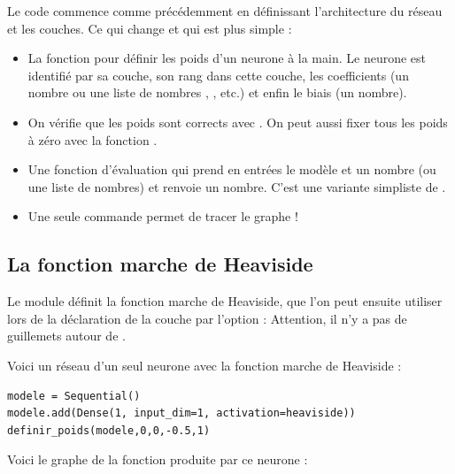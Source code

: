 \documentclass[11pt,class=report,crop=false]{standalone}
\begin{document}
Le code commence comme précédemment en définissant l'architecture du réseau et les couches.
Ce qui change et qui est plus simple :
\begin{itemize}
  \item La fonction 
  pour définir les poids d'un neurone à la main. Le neurone est identifié par sa couche, son rang dans cette couche, les coefficients (un nombre  ou une liste de nombres \ci{[a1,a2]}, \ci{[a1,a2,a3]}, etc.) et enfin le biais (un nombre).

  \item On vérifie que les poids sont corrects avec .
  On peut aussi fixer tous les poids à zéro avec la fonction .

  \item Une fonction d'évaluation 
  qui prend en entrées le modèle et un nombre (ou une liste de nombres) et renvoie un nombre.
  C'est une variante simpliste de .
  
  \item Une seule commande permet de tracer le graphe !
\end{itemize}

\subsection{La fonction marche de Heaviside}

Le module  définit la fonction marche de Heaviside, que l'on peut ensuite utiliser lors de la déclaration de la couche par l'option :
Attention, il n'y a pas de guillemets autour de .

Voici un réseau d'un seul neurone avec la fonction marche de Heaviside :


\begin{lstlisting}
modele = Sequential()
modele.add(Dense(1, input_dim=1, activation=heaviside))
definir_poids(modele,0,0,-0.5,1)
\end{lstlisting}

Voici le graphe de la fonction produite par ce neurone :
\end{document}
